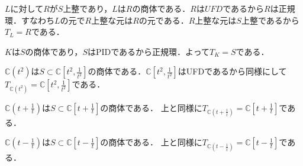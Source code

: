 \documentclass[
		book,
		head_space=20mm,
		foot_space=20mm,
		gutter=10mm,
		line_length=190mm
]{jlreq}
\begin{document}
$L$に対して$R$が$S$上整であり，$L$は$R$の商体である．$R$は$UFD$であるから$R$は正規環．すなわち$L$の元で$R$上整な元は$R$の元である．$R$上整な元は$S$上整であるから$T_L=R$である．

$K$は$S$の商体であり，$S$はPIDであるから正規環．よって$T_K=S$である．

$\mathbb{C}(t^2)$は$S\subset \mathbb{C}[t^2,\frac{1}{t^2}]$の商体である．$\mathbb{C}[t^2,\frac{1}{t^2}]$はUFDであるから同様にして$T_{\mathbb{C}(t^2)}=\mathbb{C}[t^2,\frac{1}{t^2}]$である．

$\mathbb{C}(t+\frac{1}{t})$は$S\subset \mathbb{C}[t+\frac{1}{t}]$の商体である．
上と同様に$T_{\mathbb{C}(t+\frac{1}{t})}=\mathbb{C}[t+\frac{1}{t}]$である．

$\mathbb{C}(t-\frac{1}{t})$は$S\subset \mathbb{C}[t-\frac{1}{t}]$の商体である．
上と同様に$T_{\mathbb{C}(t-\frac{1}{t})}=\mathbb{C}[t-\frac{1}{t}]$である．
\end{document}
